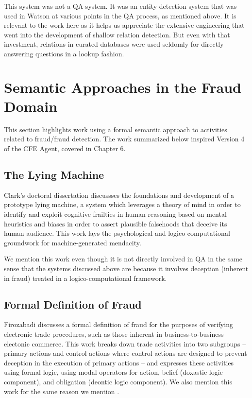 This system was not a QA system.  It was an entity detection system that was used in Watson at various points in the QA process, as mentioned above.  It is relevant to the work here as it helps us appreciate the extensive  engineering that went into the development of shallow relation detection.  But even with that investment, relations in curated databases were used seldomly for directly answering questions in a lookup fashion.


\section{Semantic Approaches in the Fraud Domain}

This section highlights work using a formal semantic approach to activities related to fraud/fraud detection.  The work summarized below inspired Version 4 of the CFE Agent, covered in Chapter 6.

\subsection{The Lying Machine}

Clark's doctoral dissertation \cite{Clark:2010:CIL:2019791} discussses the foundations and development of a prototype lying machine, a system which leverages a theory of mind in order to identify and exploit cognitive frailties in human reasoning based on mental heuristics and biases in order to assert plausible falsehoods that deceive its human audience.  This work lays the psychological and logico-computational groundwork for machine-generated mendacity.

We mention this work even though it is not directly involved in QA in the same sense that the systems discussed above are because it involves deception (inherent in fraud) treated in a logico-computational framework.  

\subsection{Formal Definition of Fraud}

Firozabadi \cite{firozabadi1998formal} discusses a formal definition of fraud for the purposes of verifying electronic trade procedures, such as those inherent in business-to-business electonic commerce.  This work breaks down trade activities into two subgroups -- primary actions and control actions where control actions are designed to prevent deception in the execution of primary actions -- and expresses these activities using formal logic, using modal operators for action, belief (doxastic logic component), and obligation (deontic logic component).  We also mention this work for the same reason we mention \cite{Clark:2010:CIL:2019791}.  

